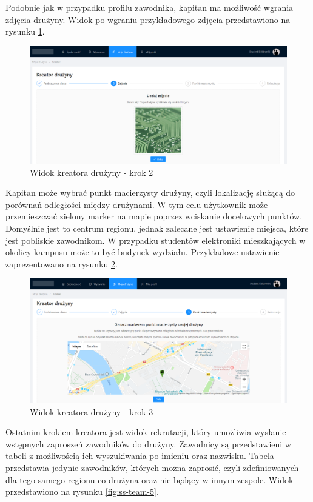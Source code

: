 Podobnie jak w przypadku profilu zawodnika, kapitan ma możliwość wgrania zdjęcia drużyny. Widok po wgraniu przykładowego zdjęcia przedstawiono na rysunku \ref{fig:ss-team-2}.

\begin{figure}[H]
\centering
\includegraphics[width=\linewidth]{065-dzialanie/rys/ss-team-2.PNG}
\caption{Widok kreatora drużyny - krok 2}
\label{fig:ss-team-2}
\end{figure}

Kapitan może wybrać punkt macierzysty drużyny, czyli lokalizację służącą do porównań odległości między drużynami. W tym celu użytkownik może przemieszczać zielony marker na mapie poprzez wciskanie docelowych punktów. Domyślnie jest to centrum regionu, jednak zalecane jest ustawienie miejsca, które jest pobliskie zawodnikom. W przypadku studentów elektroniki mieszkających w okolicy kampusu może to być budynek wydziału. Przykładowe ustawienie zaprezentowano na rysunku \ref{fig:ss-team-3}. 

\begin{figure}[H]
\centering
\includegraphics[width=\linewidth]{065-dzialanie/rys/ss-team-3.PNG}
\caption{Widok kreatora drużyny - krok 3}
\label{fig:ss-team-3}
\end{figure}

Ostatnim krokiem kreatora jest widok rekrutacji, który umożliwia wysłanie wstępnych zaproszeń zawodników do drużyny. Zawodnicy są przedstawieni w tabeli z możliwością ich wyszukiwania po imieniu oraz nazwisku. Tabela przedstawia jedynie zawodników, których można zaprosić, czyli zdefiniowanych dla tego samego regionu co drużyna oraz nie będący w innym zespole. Widok przedstawiono na rysunku \ref{fig:ss-team-5}.

